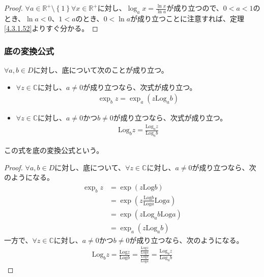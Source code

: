 \documentclass[dvipdfmx]{jsarticle}
\begin{document}
\begin{proof}
$\forall a \in \mathbb{R}^{+} \setminus \left\{ 1 \right\}\forall x \in \mathbb{R}^{+}$に対し、$\log_{a}x = \frac{\ln x}{\ln a}$が成り立つので、$0 < a < 1$のとき、$\ln a < 0$、$1 < a$のとき、$0 < \ln a$が成り立つことに注意すれば、定理\ref{4.3.1.52}よりすぐ分かる。
\end{proof}
\subsubsection{底の変換公式}%
\begin{thm}[底の変換公式]\label{4.3.3.23} $\forall a,b \in D$に対し、底について次のことが成り立つ。
\begin{itemize}
\item
  $\forall z \in \mathbb{C}$に対し、$a \neq 0$が成り立つなら、次式が成り立つ。
\begin{align*}
\exp_{b}z = \exp_{a}\left( z\mathrm{Log}_{a}b \right)
\end{align*}
\item
  $\forall z \in \mathbb{C}$に対し、$a \neq 0$かつ$b \neq 0$が成り立つなら、次式が成り立つ。
\begin{align*}
\mathrm{Log}_{b}z = \frac{\mathrm{Log}_{a}z}{\mathrm{Log}_{a}b}
\end{align*}
\end{itemize}
この式を底の変換公式という。
\end{thm}
\begin{proof}
$\forall a,b \in D$に対し、底について、$\forall z \in \mathbb{C}$に対し、$a \neq 0$が成り立つなら、次のようになる。
\begin{align*}
\exp_{b}z &= \exp\left( z\mathrm{Log}b \right)\\
&= \exp\left( z\frac{\mathrm{Log}b}{\mathrm{Log}a}\mathrm{Log}a \right)\\
&= \exp\left( z\mathrm{Log}_{a}b\mathrm{Log}a \right)\\
&= \exp_{a}\left( z\mathrm{Log}_{a}b \right)
\end{align*}
一方で、$\forall z \in \mathbb{C}$に対し、$a \neq 0$かつ$b \neq 0$が成り立つなら、次のようになる。
\begin{align*}
\mathrm{Log}_{b}z = \frac{\mathrm{Log}z}{\mathrm{Log}b} = \frac{\frac{\mathrm{Log}z}{\mathrm{Log}a}}{\frac{\mathrm{Log}b}{\mathrm{Log}a}} = \frac{\mathrm{Log}_{a}z}{\mathrm{Log}_{a}b}
\end{align*}
\end{proof}
\end{document}
